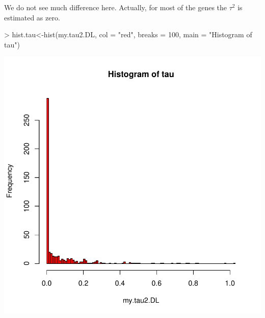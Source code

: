 \documentclass[a4paper]{report}
\begin{document}
We do not see much difference here. Actually, for most of the genes the $\tau^2$ is estimated as zero. 
\begin{center}
\begin{Schunk}
\begin{Sinput}
> hist.tau<-hist(my.tau2.DL, col = "red", breaks = 100, main = "Histogram of tau")
\end{Sinput}
\end{Schunk}
\includegraphics{MAMA_full-019}
\end{center}
\end{document}
